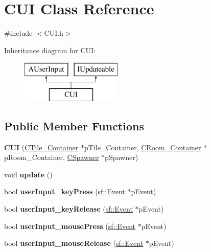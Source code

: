 \hypertarget{classCUI}{\section{C\-U\-I Class Reference}
\label{classCUI}
}


{\ttfamily \#include $<$C\-U\-I.\-h$>$}

Inheritance diagram for C\-U\-I\-:\begin{figure}[H]
\begin{center}
\leavevmode
\includegraphics[height=2.000000cm]{classCUI}
\end{center}
\end{figure}
\subsection*{Public Member Functions}
\begin{DoxyCompactItemize}
\item 
\hypertarget{classCUI_a0332db7aa3a731b21009682464f3dcb8}{{\bfseries C\-U\-I} (\hyperlink{classCTile__Container}{C\-Tile\-\_\-\-Container} $\ast$p\-Tile\-\_\-\-Container, \hyperlink{classCRoom__Container}{C\-Room\-\_\-\-Container} $\ast$p\-Room\-\_\-\-Container, \hyperlink{classCSpawner}{C\-Spawner} $\ast$p\-Spawner)}\label{classCUI_a0332db7aa3a731b21009682464f3dcb8}

\item 
\hypertarget{classCUI_ab0b322040b41a6650bd625216f77b75c}{void {\bfseries update} ()}\label{classCUI_ab0b322040b41a6650bd625216f77b75c}

\item 
\hypertarget{classCUI_addb1531f20541cb7c7f8688f1cd843e9}{bool {\bfseries user\-Input\-\_\-key\-Press} (\hyperlink{classsf_1_1Event}{sf\-::\-Event} $\ast$p\-Event)}\label{classCUI_addb1531f20541cb7c7f8688f1cd843e9}

\item 
\hypertarget{classCUI_a0495bb6ad5fba9ef0552a487151f7896}{bool {\bfseries user\-Input\-\_\-key\-Release} (\hyperlink{classsf_1_1Event}{sf\-::\-Event} $\ast$p\-Event)}\label{classCUI_a0495bb6ad5fba9ef0552a487151f7896}

\item 
\hypertarget{classCUI_a6edfa48bb429f6e1468f5c3568cf83c5}{bool {\bfseries user\-Input\-\_\-mouse\-Press} (\hyperlink{classsf_1_1Event}{sf\-::\-Event} $\ast$p\-Event)}\label{classCUI_a6edfa48bb429f6e1468f5c3568cf83c5}

\item 
\hypertarget{classCUI_a64e3c8ad256e2d814e7112d201cb78ae}{bool {\bfseries user\-Input\-\_\-mouse\-Release} (\hyperlink{classsf_1_1Event}{sf\-::\-Event} $\ast$p\-Event)}\label{classCUI_a64e3c8ad256e2d814e7112d201cb78ae}

\end{DoxyCompactItemize}
